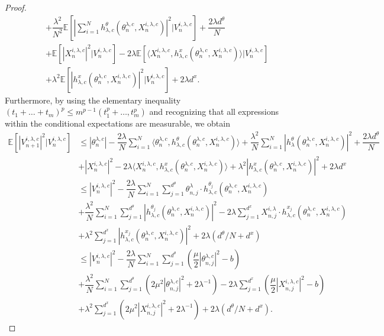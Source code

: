 \documentclass[a4paper, 10pt]{article}
\theoremstyle{plain}%
\begin{document}
\begin{proof}
\begin{align*}
&+\dfrac{\lambda^2}{N^2}\mathbb{E}\left[\left|\sum_{i=1}^Nh_{\lambda,c}^{\theta}(\theta_{n}^{\lambda,c},X_{n}^{i,\lambda,c})\right|^2|V_{n}^{i,\lambda,c}\right]+\dfrac{2\lambda d^{\theta}}{N}\\
&+\mathbb{E}\left[\left|X_{n}^{i,\lambda,c}\right|^2|V_{n}^{i,\lambda,c}\right]-2\lambda\mathbb{E}\left[\langle X_n^{i,\lambda,c},h_{\lambda,c}^{x}(\theta_{n}^{\lambda,c},X_{n}^{i,\lambda,c})\rangle|V_{n}^{i,\lambda,c}\right]\\&+{\lambda}^2\mathbb{E}\left[|h_{\lambda,c}^x(\theta_{n}^{\lambda,c},X_{n}^{i,\lambda,c})|^2|V_{n}^{i,\lambda,c}\right]+2\lambda d^x.
\end{align*}
Furthermore, by using the elementary inequality $(t_1+\ldots+t_m)^p\leq m^{p-1}(t_1^p+\ldots,t_m^p)$ and recognizing that all expressions within the conditional expectations are measurable, we obtain
\begin{align*}
\mathbb{E}\left[\left|V_{n+1}^{i,\lambda,c}\right|^2|V_{n}^{i,\lambda,c}\right]&\leq |\theta_{n}^{\lambda,c}|-\dfrac{2\lambda}{N}\sum_{i=1}^N\langle \theta_n^{\lambda,c},h_{\lambda,c}^{\theta}(\theta_{n}^{\lambda,c},X_{n}^{i,\lambda,c})\rangle+\dfrac{\lambda^2}{N}\sum_{i=1}^N|h_\lambda^{\theta}(\theta_{n}^{\lambda,c},X_{n}^{i,\lambda,c})|^2+\dfrac{2\lambda d^{\theta}}{N} \\ &+|X_n^{i,\lambda,c}|^2-2\lambda\langle X_n^{i,\lambda,c},h_{\lambda,c}^{x}(\theta_{n}^{\lambda,c},X_{n}^{i,\lambda,c}) \rangle+{\lambda}^2|h_{\lambda,c}^{x}(\theta_{n}^{\lambda,c},X_{n}^{i,\lambda,c})|^2+2\lambda d^x\\
&\leq \left|V_{n}^{i,\lambda,c}\right|^2-\dfrac{2\lambda}{N}\sum_{i=1}^N\sum_{j=1}^{d^{\theta}}\theta_{n,j}^{\lambda}\cdot h^{\theta_j}_{\lambda,c}(\theta_n^{\lambda,c},X_n^{i,\lambda,c})\\
&+\dfrac{\lambda^2}{N}\sum_{i=1}^N\sum_{j=1}^{d^{\theta}}|h_{\lambda,c}^{\theta_j}(\theta_{n}^{\lambda,c},X_{n}^{i,\lambda,c})|^2-2\lambda\sum_{j=1}^{d^{x}}X_{n,j}^{i,\lambda}\cdot h^{x_j}_{\lambda,c}(\theta_n^{\lambda,c},X_n^{i,\lambda,c})\\
&+\lambda^2\sum_{j=1}^{d^{x}}|h_{\lambda,c}^{x_j}(\theta_{n}^{\lambda,c},X_{n}^{i,\lambda,c})|^2+2\lambda(d^{\theta}/N+d^x)\\
&\leq \left|V_{n}^{i,\lambda,c}\right|^2-\dfrac{2\lambda}{N}\sum_{i=1}^N\sum_{j=1}^{d^{\theta}}\left(\dfrac{\mu}{2}|\theta^{\lambda,c}_{n,j}|^2-b\right)\\
&+\dfrac{\lambda^2}{N}\sum_{i=1}^N\sum_{j=1}^{d^{\theta}}\left(2\mu^2|\theta^{\lambda,c}_{n,j}|^2+2\lambda^{-1}\right)-2\lambda\sum_{j=1}^{d^{x}}\left(\dfrac{\mu}{2}|X^{i,\lambda,c}_{n,j}|^2-b\right)\\&+\lambda^2\sum_{j=1}^{d^{x}}\left(2\mu^2|X^{i,\lambda,c}_{n,j}|^2+2\lambda^{-1}\right)+2\lambda(d^{\theta}/N+d^x).

\end{align*}
\end{proof}
\end{document}
